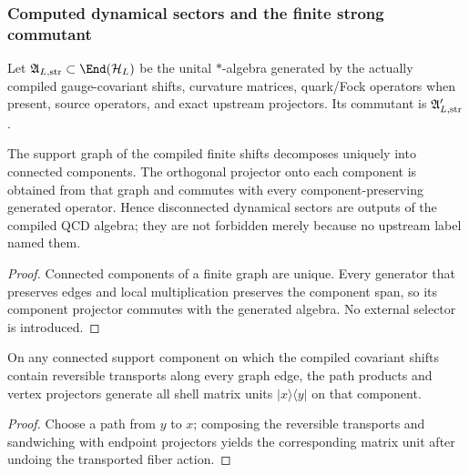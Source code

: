 \documentclass[12pt,a4paper]{article}
\begin{document}
\subsubsection{Computed dynamical sectors and the finite strong commutant}
\label{p10:subsec:no-branch-strong-algebra}

\begin{definition}
\label{p10:def:finite-strong-generated-algebra}
Let \(\mathfrak A_{L,{\rm str}}\subset\End(\mathcal H_L)\) be the unital \(*\)-algebra generated by the actually compiled gauge-covariant shifts, curvature matrices, quark/Fock operators when present, source operators, and exact upstream projectors.  Its commutant is \(\mathfrak A'_{L,{\rm str}}\).
\end{definition}

\begin{lemma}
\label{p10:lem:primitive-exact-block-shell-connectivity}
The support graph of the compiled finite shifts decomposes uniquely into connected components.  The orthogonal projector onto each component is obtained from that graph and commutes with every component-preserving generated operator.  Hence disconnected dynamical sectors are outputs of the compiled QCD algebra; they are not forbidden merely because no upstream label named them.
\end{lemma}
\begin{proof}
Connected components of a finite graph are unique.  Every generator that preserves edges and local multiplication preserves the component span, so its component projector commutes with the generated algebra.  No external selector is introduced.
\end{proof}

\begin{lemma}
\label{p10:lem:shell-graph-matrix-units}
On any connected support component on which the compiled covariant shifts contain reversible transports along every graph edge, the path products and vertex projectors generate all shell matrix units \(|x\rangle\langle y|\) on that component.
\end{lemma}
\begin{proof}
Choose a path from \(y\) to \(x\); composing the reversible transports and sandwiching with endpoint projectors yields the corresponding matrix unit after undoing the transported fiber action.
\end{proof}
\end{document}
